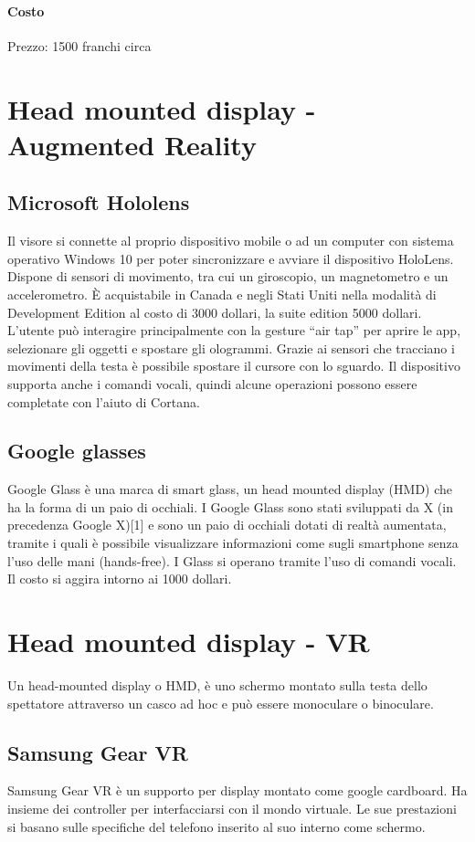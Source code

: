 \documentclass[8pt]{extarticle}
\begin{document}
\begin{multicols}{3}
\paragraph{Costo}
Prezzo: 1500 franchi circa
\section{Head mounted display - Augmented Reality}
\subsection{Microsoft Hololens}
Il visore si connette al proprio dispositivo mobile o ad un computer con sistema operativo Windows 10 per poter sincronizzare e avviare il dispositivo HoloLens.
Dispone di sensori di movimento, tra cui un giroscopio, un magnetometro e un accelerometro.
È acquistabile in Canada e negli Stati Uniti nella modalità di Development Edition al costo di 3000 dollari, la suite edition 5000 dollari.
L’utente può interagire principalmente con la gesture “air tap” per aprire le app, selezionare gli oggetti e spostare gli ologrammi. Grazie ai sensori che tracciano i movimenti della testa è possibile spostare il cursore con lo sguardo. Il dispositivo supporta anche i comandi vocali, quindi alcune operazioni possono essere completate con l’aiuto di Cortana.
\subsection{Google glasses}
Google Glass è una marca di smart glass, un head mounted display (HMD) che ha la forma di un paio di occhiali. I Google Glass sono stati sviluppati da X (in precedenza Google X)[1] e sono un paio di occhiali dotati di realtà aumentata, tramite i quali è possibile visualizzare informazioni come sugli smartphone senza l'uso delle mani (hands-free). I Glass si operano tramite l'uso di comandi vocali.
Il costo si aggira intorno ai 1000 dollari.

\section{Head mounted display - VR}
Un head-mounted display o HMD, è uno schermo montato sulla testa dello spettatore attraverso un casco ad hoc e può essere monoculare o binoculare.
\subsection{Samsung Gear VR}
Samsung Gear VR è un supporto per display montato come google cardboard.
Ha insieme dei controller per interfacciarsi con il mondo virtuale.
Le sue prestazioni si basano sulle specifiche del telefono inserito al suo interno come schermo.

\end{multicols}
\end{document}
